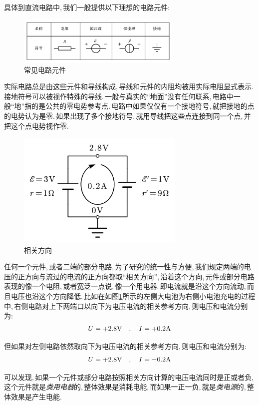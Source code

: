 具体到直流电路中,\,我们一般提供以下理想的电路元件:
\begin{figure}[H]
\centering
\includegraphics[width=0.7\textwidth]{image/7-3-8.png}
\caption{常见电路元件}
\end{figure}

实际电路总是由这些元件和导线构成,\,导线和元件的内阻均被用实际电阻显式表示.\,接地符号可以被视作特殊的导线.\,一般与真实的``地面''没有任何联系,\,电路中一般``地''指的是公共的零电势参考点.\,电路中如果仅仅有一个接地符号,\,就把接地的点的电势认为是零.\,如果出现了多个接地符号,\,就用导线把这些点连接到同一个点,\,并把这个点电势视作零.

\begin{figure}
\centering
\vspace{-1cm}
\includegraphics[width=8cm]{image/7-3-9.png}
\caption{相关方向}\label{fig7-3-9}
\end{figure}
任何一个元件,\,或者二端的部分电路,\,为了研究的统一性与方便,\,我们规定两端的电压的正方向与流过的电流的正方向都取``相关方向'',\,沿着这个方向,\,元件或部分电路表现的像一个电阻,\,或者宽泛一点说,\,像一个用电器.\,即电流就是沿这个方向流动,\,而且电压也沿这个方向降低.\,比如在如图\ref{fig7-3-9}所示的左侧大电池为右侧小电池充电的过程中,\,右侧电路对上下两端口以向下为电压电流的相关参考方向,\,则电压和电流分别为:
\[U=+2.8{\rm V}\quad ,\quad I=+0.2{\rm A}\]

但如果对左侧电路依然取向下为电压电流的相关参考方向,\,则电压和电流分别为:
\[U=+2.8{\rm V}\quad ,\quad I=-0.2{\rm A}\]

可以发现,\,如果一个元件或部分电路按照相关方向计算的电压电流同时是正或者负,\,这个元件就是\emph{类用电器}的,\,整体效果是消耗电能,\,而如果一正一负,\,就是\emph{类电源}的,\,整体效果是产生电能.

